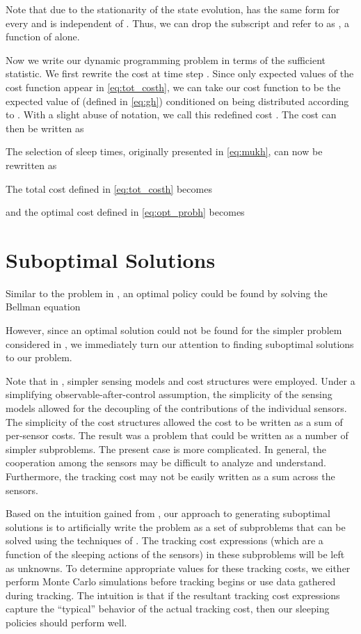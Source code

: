 \documentclass[journal,draftcls,onecolumn,11pt]{IEEEtran}
\begin{document}
Note that due to the stationarity of the state evolution,  has the same form for every  and is independent of .  Thus, we can drop the subscript and refer to  as , a function of  alone.

Now we write our dynamic programming problem in terms of the sufficient statistic.  We first rewrite the cost at time step .  Since only expected values of the cost function  appear in \eqref{eq:tot_costh}, we can take our cost function to be the expected value of  (defined in \eqref{eq:gh}) conditioned on  being distributed according to . With a slight abuse of notation, we call this redefined cost . The cost can then be written as

The selection of sleep times, originally presented in \eqref{eq:mukh}, can now be rewritten as

The total cost defined in \eqref{eq:tot_costh} becomes

and the optimal cost defined in \eqref{eq:opt_probh} becomes











\section{Suboptimal Solutions} \label{sec:subopt_sol}

Similar to the problem in \cite{fuemmeler08}, an optimal policy could be found by solving the Bellman equation

However, since an optimal solution could not be found for the simpler problem considered in \cite{fuemmeler08}, we immediately turn our attention to finding suboptimal solutions to our problem.

Note that in \cite{fuemmeler08}, simpler sensing models and cost structures were employed. Under a simplifying observable-after-control assumption, the simplicity of the sensing models allowed for the decoupling of the contributions of the individual sensors.  The simplicity of the cost structures allowed the cost to be written as a sum of per-sensor costs.  The result was a problem that could be written as a number of simpler subproblems. The present case is more complicated.  In general, the cooperation among the sensors may be difficult to analyze and understand.  Furthermore, the tracking cost may not be easily written as a sum across the sensors.

Based on the intuition gained from \cite{fuemmeler08}, our approach to generating suboptimal solutions is to artificially write the problem as a set of subproblems that can be solved using the techniques of \cite{fuemmeler08}. The tracking cost expressions (which are a function of the sleeping actions of the sensors) in these subproblems will be left as unknowns. To determine appropriate values for these tracking costs, we either perform Monte Carlo simulations before tracking begins or use data gathered during tracking.  The intuition is that if the resultant tracking cost expressions capture the ``typical'' behavior of the actual tracking cost, then our sleeping policies should perform well.
\end{document}
